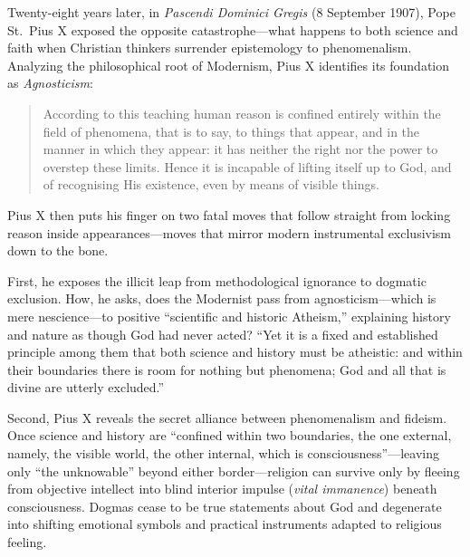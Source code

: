 Twenty-eight years later, in \emph{Pascendi Dominici Gregis} (8 September 1907), Pope St.\ Pius X exposed the opposite catastrophe---what happens to both science and faith when Christian thinkers surrender epistemology to phenomenalism. Analyzing the philosophical root of Modernism, Pius X identifies its foundation as \emph{Agnosticism}:

\begin{quote}
According to this teaching human reason is confined entirely within the field of phenomena, that is to say, to things that appear, and in the manner in which they appear: it has neither the right nor the power to overstep these limits. Hence it is incapable of lifting itself up to God, and of recognising His existence, even by means of visible things.
\end{quote}

Pius X then puts his finger on two fatal moves that follow straight from locking reason inside appearances---moves that mirror modern instrumental exclusivism down to the bone.

First, he exposes the illicit leap from methodological ignorance to dogmatic exclusion. How, he asks, does the Modernist pass from agnosticism---which is mere nescience---to positive ``scientific and historic Atheism,'' explaining history and nature as though God had never acted? ``Yet it is a fixed and established principle among them that both science and history must be atheistic: and within their boundaries there is room for nothing but phenomena; God and all that is divine are utterly excluded.''

Second, Pius X reveals the secret alliance between phenomenalism and fideism. Once science and history are ``confined within two boundaries, the one external, namely, the visible world, the other internal, which is consciousness''---leaving only ``the unknowable'' beyond either border---religion can survive only by fleeing from objective intellect into blind interior impulse (\emph{vital immanence}) beneath consciousness. Dogmas cease to be true statements about God and degenerate into shifting emotional symbols and practical instruments adapted to religious feeling.

